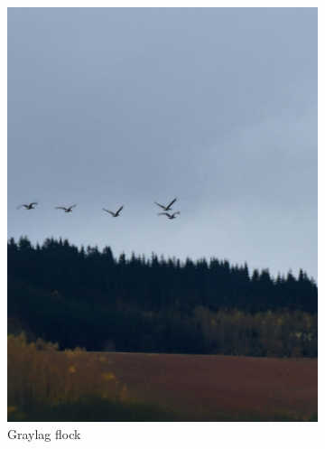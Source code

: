 \documentclass[twocolumn]{article}
\begin{document}
\begin{figure}[H]
\begin{subfigure}{0.48\columnwidth}
\includegraphics[width=\textwidth]{06_geese_flight_formation.jpg}
\caption{Graylag flock}
\end{subfigure}
\hfill
\begin{subfigure}{0.48\columnwidth}

\end{subfigure}
\end{figure}
\end{document}

